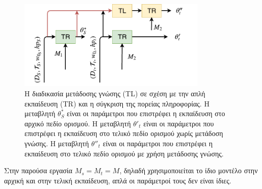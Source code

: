 




\begin{figure}
    \centering
    \includegraphics[width = 0.8\textwidth]{figures/transferLearning/TL.pdf}
    \caption[Η διαδικασία μετάδοσης γνώσης]{Η διαδικασία μετάδοσης γνώσης (TL) σε σχέση με την απλή εκπαίδευση (TR) και η σύγκριση της πορείας πληροφορίας. Η μεταβλητή $\theta^*_S$ είναι οι παράμετροι που επιστρέφει η εκπαίδευση στο αρχικό πεδίο ορισμού. Η μεταβλητή $\theta'_t$ είναι οι παράμετροι που επιστρέφει η εκπαίδευση στο τελικό πεδίο ορισμού χωρίς μετάδοση γνώσης. Η μεταβλητή $\theta''_t$ είναι οι παράμετροι που επιστρέφει η εκπαίδευση στο τελικό πεδίο ορισμού με χρήση μετάδοσης γνώσης.}
    \label{fig:TL}
\end{figure}
    






Στην παρούσα εργασία $ M_s = M_t = M$, δηλαδή χρησιμοποιείται το ίδιο μοντέλο στην αρχική και στην τελική εκπαίδευση, απλά οι παράμετροί τους δεν είναι ίδιες.

